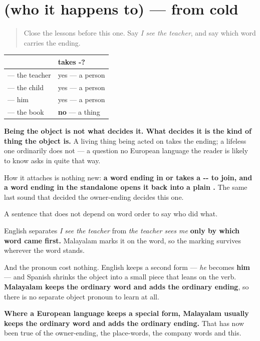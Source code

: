 \section[(who it happens to)]{(who it happens to) — from cold}

\label{lesson:ML-R87-object-recall}



\begin{quote}
Close the lessons before this one. Say \emph{I see the teacher}, and say which word carries the ending.
\end{quote}

\begin{grammarlens}[title={Grammar Lens: the doer wears nothing, the done-to wears -\ml{എ}}]
\noindent
\begin{tabularx}{\linewidth}{@{}>{\raggedright\arraybackslash}X>{\raggedright\arraybackslash}X@{}}
\toprule
\textbf{} & \textbf{takes \textbf{-\ml{എ}}?} \\
\midrule
\textbf{\ml{അധ്യാപകനെ}} — the teacher & yes — a person \\
\textbf{\ml{കുട്ടിയെ}} — the child & yes — a person \\
\textbf{\ml{അവനെ}} — him & yes — a person \\
\textbf{\ml{പുസ്തകം}} — the book & \textbf{no} — a thing \\
\bottomrule
\end{tabularx}

\textbf{Being the object is not what decides it. What decides it is the kind of thing the object is.} A living thing being acted on takes the ending; a lifeless one ordinarily does not — a question no European language the reader is likely to know asks in quite that way.

How it attaches is nothing new: \textbf{a word ending in  or  takes a -- to join, and a word ending in the standalone  opens it back into a plain .} The same last sound that decided the owner-ending decides this one.
\end{grammarlens}

\begin{grammarlens}[title={What you've built}]
A sentence that does not depend on word order to say who did what.

English separates \emph{I see the teacher} from \emph{the teacher sees me} \textbf{only by which word came first.} Malayalam marks it on the word, so the marking survives wherever the word stands.

And the pronoun cost nothing. English keeps a second form — \emph{he} becomes \textbf{him} — and Spanish shrinks the object into a small piece that leans on the verb. \textbf{Malayalam keeps the ordinary word and adds the ordinary ending}, so there is no separate object pronoun to learn at all.

\textbf{Where a European language keeps a special form, Malayalam usually keeps the ordinary word and adds the ordinary ending.} That has now been true of the owner-ending, the place-words, the company words and this.
\end{grammarlens}

